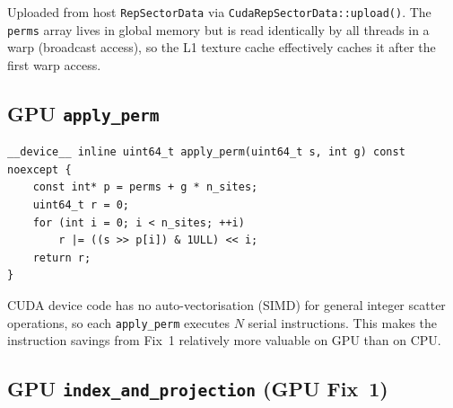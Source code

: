 \documentclass[11pt,a4paper]{article}
\begin{document}
Uploaded from host \texttt{RepSectorData} via \texttt{CudaRepSectorData::upload()}.
The \texttt{perms} array lives in global memory but is read identically by all
threads in a warp (broadcast access), so the L1 texture cache effectively
caches it after the first warp access.

\subsection{GPU \texttt{apply\_perm}}

\begin{lstlisting}[caption={Device site-permutation (identical to CPU scalar loop)}]
__device__ inline uint64_t apply_perm(uint64_t s, int g) const noexcept {
    const int* p = perms + g * n_sites;
    uint64_t r = 0;
    for (int i = 0; i < n_sites; ++i)
        r |= ((s >> p[i]) & 1ULL) << i;
    return r;
}
\end{lstlisting}

CUDA device code has no auto-vectorisation (SIMD) for general integer scatter
operations, so each \texttt{apply\_perm} executes $N$ serial instructions.
This makes the instruction savings from Fix~1 relatively more valuable on GPU
than on CPU.

\subsection{GPU \texttt{index\_and\_projection} (GPU Fix~1)}
\label{sec:iap_gpu}
\end{document}
